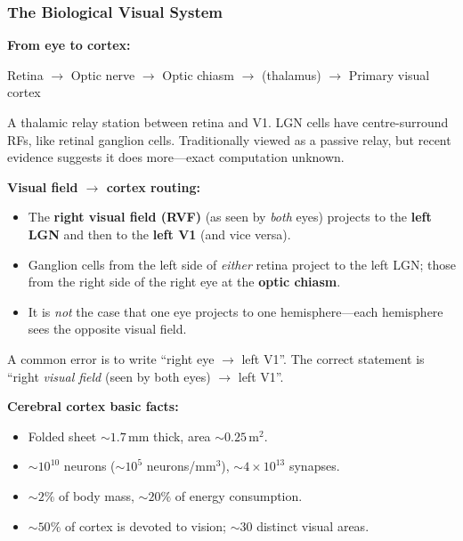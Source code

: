\bigseparator

\subsubsection{The Biological Visual System}

\textbf{From eye to cortex:}
\begin{center}
Retina $\rightarrow$ Optic nerve $\rightarrow$ Optic chiasm $\rightarrow$  (thalamus) $\rightarrow$ Primary visual cortex 
\end{center}

\begin{defbox}
A thalamic relay station between retina and V1. LGN cells have centre-surround RFs, like retinal ganglion cells. Traditionally viewed as a passive relay, but recent evidence suggests it does more---exact computation unknown.
\end{defbox}

\textbf{Visual field $\rightarrow$ cortex routing:}
\begin{itemize}
  \item The \textbf{right visual field (RVF)} (as seen by \emph{both} eyes) projects to the \textbf{left LGN} and then to the \textbf{left V1} (and vice versa).
  \item Ganglion cells from the left side of \emph{either} retina project to the left LGN; those from the right side of the right eye  at the \textbf{optic chiasm}.
  \item It is \emph{not} the case that one eye projects to one hemisphere---each hemisphere sees the opposite visual field.
\end{itemize}

\begin{tipbox}
A common error is to write ``right eye $\rightarrow$ left V1''. The correct statement is ``right \emph{visual field} (seen by both eyes) $\rightarrow$ left V1''.
\end{tipbox}

\separator

\textbf{Cerebral cortex basic facts:}
\begin{itemize}
  \item Folded sheet $\sim 1.7$\,mm thick, area $\sim 0.25$\,m$^2$.
  \item $\sim 10^{10}$ neurons ($\sim 10^5$ neurons/mm$^3$), $\sim 4\times 10^{13}$ synapses.
  \item $\sim 2\%$ of body mass, $\sim 20\%$ of energy consumption.
  \item $\sim 50\%$ of cortex is devoted to vision; $\sim 30$ distinct visual areas.
\end{itemize}


